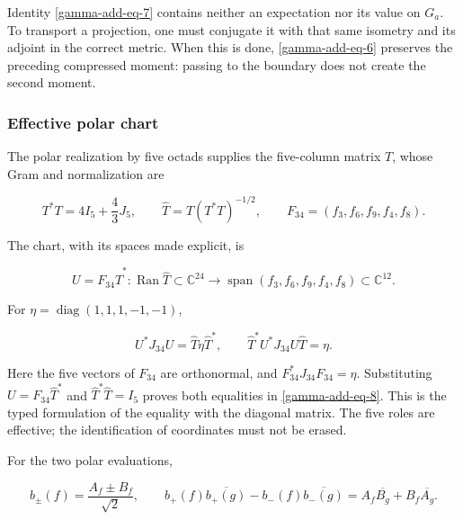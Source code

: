 Identity \eqref{gamma-add-eq-7} contains neither an expectation nor its value on \(G_a\). To transport a projection, one must conjugate it with that same isometry and its adjoint in the correct metric. When this is done, \eqref{gamma-add-eq-6} preserves the preceding compressed moment: passing to the boundary does not create the second moment.

\subsubsection{Effective polar chart}
\label{gamma-add-sub-220}

The polar realization by five octads supplies the five-column
matrix \(T\), whose Gram and normalization are

\begin{equation}
T^*T=4I_5+\frac43J_5,\qquad
\widehat T=T(T^*T)^{-1/2},\qquad
F_{34}=(f_3,f_6,f_9,f_4,f_8).
\label{gamma-add-display-18}
\end{equation}

The chart, with its spaces made explicit, is

\begin{equation}
U=F_{34}\widehat T^*:
\operatorname{Ran}\widehat T\subset\mathbb C^{24}
\longrightarrow\operatorname{span}(f_3,f_6,f_9,f_4,f_8)\subset\mathbb C^{12}.
\label{gamma-add-display-19}
\end{equation}

For \(\eta=\operatorname{diag}(1,1,1,-1,-1)\),

\begin{equation}
U^*J_{34}U=\widehat T\eta\widehat T^*,\qquad
\widehat T^*U^*J_{34}U\widehat T=\eta.
\label{gamma-add-eq-8}
\end{equation}

Here the five vectors of \(F_{34}\) are orthonormal, and
\(F_{34}^*J_{34}F_{34}=\eta\). Substituting
\(U=F_{34}\widehat T^*\) and \(\widehat T^*\widehat T=I_5\)
proves both equalities in \eqref{gamma-add-eq-8}.
This is the typed formulation of the equality with the diagonal matrix.
The five roles are effective; the identification of coordinates must
not be erased.

For the two polar evaluations,

\begin{equation}
b_\pm(f)=\frac{A_f\pm B_f}{\sqrt2},\qquad
b_+(f)\overline{b_+(g)}-b_-(f)\overline{b_-(g)}
=A_f\overline{B_g}+B_f\overline{A_g}.
\label{gamma-add-eq-9}
\end{equation}

